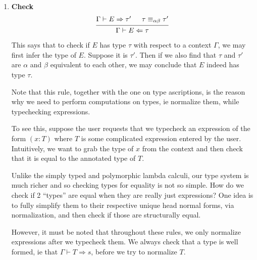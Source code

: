 \documentclass{article}
\begin{document}
\begin{definition} 
\begin{enumerate}
    \[
      \begin{prooftree}
        \hypo{\Gamma \vdash E \Leftarrow \Kind}
        \infer1{\Gamma \vdash (E : \Kind) \Rightarrow \Kind}
      \end{prooftree}
    \]
    Note that the first rule doesn't allow users to assert that $(E : \Kind)$
    since there is no $s$ with $\Gamma \vdash \Kind \Rightarrow s$.
    This second rule allows users to assert that \verb|Type| and type constructors
    have type \verb|Kind|.
    
  \item \textbf{Check} \\
    \[
      \begin{prooftree}
        \hypo{\Gamma \vdash E \Rightarrow \tau'}
        \hypo{\tau \equiv_{\alpha \beta} \tau'}
        \infer2{\Gamma \vdash E \Leftarrow \tau}
      \end{prooftree}
    \]

    This says that to check if $E$ has type $\tau$ with respect to a context
    $\Gamma$, we may first infer the type of $E$. Suppose it is $\tau'$. Then
    if we also find that $\tau$ and $\tau'$ are $\alpha$ and $\beta$ equivalent
    to each other, we may conclude that $E$ indeed has type $\tau$.

    \begin{remark}
      Note that this rule, together with the one on type ascriptions, is the reason
      why we need to perform computations on types, ie normalize them, while
      typechecking expressions. 

      To see this, suppose the user requests that we typecheck an expression
      of the form $(x : T)$
      where $T$ is some complicated expression entered by the user.
      Intuitively, we want to grab the type of $x$ from the context and then
      check that it is equal to the annotated type of $T$.

      Unlike the simply typed and polymorphic lambda calculi, our type system is
      much richer and so checking types for equality is not so simple.
      How do we check if 2 ``types'' are equal when they are really just expressions?
      One idea is to fully simplify them to their respective unique head normal forms,
      via normalization, and then check if those are structurally equal.

      However, it must be noted that throughout these rules, we only normalize
      expressions after we typecheck them. We always check that a type is
      well formed, ie that $\Gamma \vdash T \Rightarrow s$, before we try to
      normalize $T$.
    \end{remark}


\end{enumerate}
\end{definition}
\end{document}
